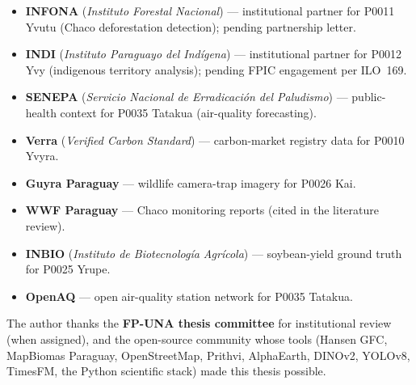 \begin{itemize}
    \item \textbf{INFONA} (\textit{Instituto Forestal Nacional}) —
      institutional partner for P0011 Yvutu (Chaco deforestation
      detection); pending partnership letter.
    \item \textbf{INDI} (\textit{Instituto Paraguayo del Indígena})
      — institutional partner for P0012 Yvy (indigenous territory
      analysis); pending FPIC engagement per ILO~169.
    \item \textbf{SENEPA} (\textit{Servicio Nacional de Erradicación
      del Paludismo}) — public-health context for P0035 Tatakua
      (air-quality forecasting).
    \item \textbf{Verra} (\textit{Verified Carbon Standard}) —
      carbon-market registry data for P0010 Yvyra.
    \item \textbf{Guyra Paraguay} — wildlife camera-trap imagery
      for P0026 Kai.
    \item \textbf{WWF Paraguay} — Chaco monitoring reports (cited
      in the literature review).
    \item \textbf{INBIO} (\textit{Instituto de Biotecnología
      Agrícola}) — soybean-yield ground truth for P0025 Yrupe.
    \item \textbf{OpenAQ} — open air-quality station network for
      P0035 Tatakua.
\end{itemize}



The author thanks the \textbf{FP-UNA thesis committee} for
institutional review (when assigned), and the open-source community
whose tools (Hansen GFC, MapBiomas Paraguay, OpenStreetMap, Prithvi,
AlphaEarth, DINOv2, YOLOv8, TimesFM, the Python scientific stack)
made this thesis possible.


